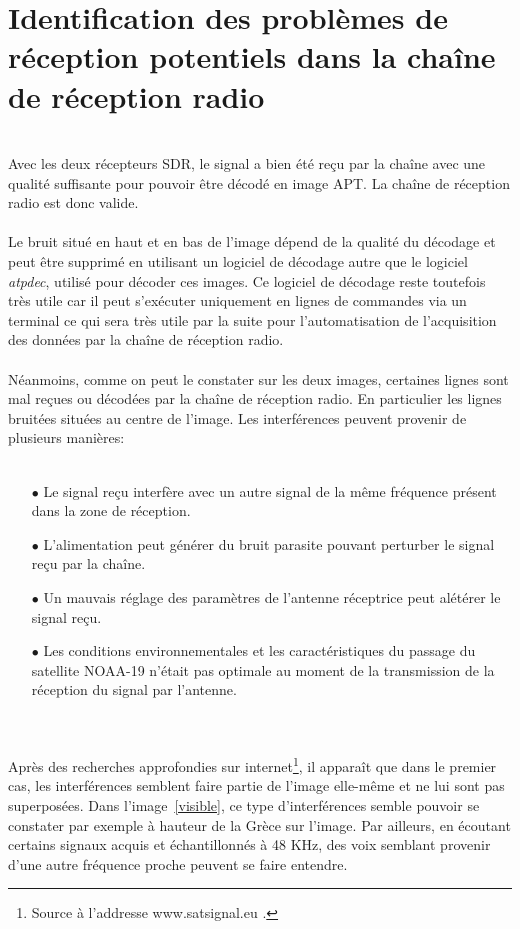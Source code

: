 \documentclass[12pt,fleqn]{book} %
\begin{document}
\section{Identification des problèmes de réception potentiels dans la chaîne de réception radio}
~\\\indent Avec les deux récepteurs SDR, le signal a bien été reçu par la chaîne avec une qualité suffisante pour pouvoir être décodé en image APT. La chaîne de réception radio est donc valide.
~\\\\Le bruit situé en haut et en bas de l'image dépend de la qualité du décodage et peut être supprimé en utilisant un logiciel de décodage autre que le logiciel \emph{atpdec}, utilisé pour décoder ces images. Ce logiciel de décodage reste toutefois très utile car il peut s'exécuter uniquement en lignes de commandes via un terminal ce qui sera très utile par la suite pour l'automatisation de l'acquisition des données par la chaîne de réception radio.
~\\\\Néanmoins, comme on peut le constater sur les deux images, certaines lignes sont mal reçues ou décodées par la chaîne de réception radio. En particulier les lignes bruitées situées au centre de l'image. Les interférences peuvent provenir de plusieurs manières:
~\\\\
\begin{itemize}
 \item[$\bullet$] Le signal reçu interfère avec un autre signal de la même fréquence présent dans la zone de réception.
 \item[$\bullet$] L'alimentation peut générer du bruit parasite pouvant perturber le signal reçu par la chaîne.
 \item[$\bullet$] Un mauvais réglage des paramètres de l'antenne réceptrice peut alétérer le signal reçu.
 \item[$\bullet$] Les conditions environnementales et les caractéristiques du passage du satellite NOAA-19 n'était pas optimale au moment de la transmission de la réception du signal par l'antenne.
\end{itemize}
~\\\\
Après des recherches approfondies sur internet\footnote{Source à l'addresse www.satsignal.eu .}, il apparaît que dans le premier cas, les interférences semblent faire partie de l'image elle-même et ne lui sont pas superposées. Dans l'image~\underline{\color{blue}\ref{visible}}, ce type d'interférences semble pouvoir se constater par exemple à hauteur de la Grèce sur l'image. Par ailleurs, en écoutant certains signaux acquis et échantillonnés à 48 KHz, des voix semblant provenir d'une autre fréquence proche peuvent se faire entendre.
\end{document}
